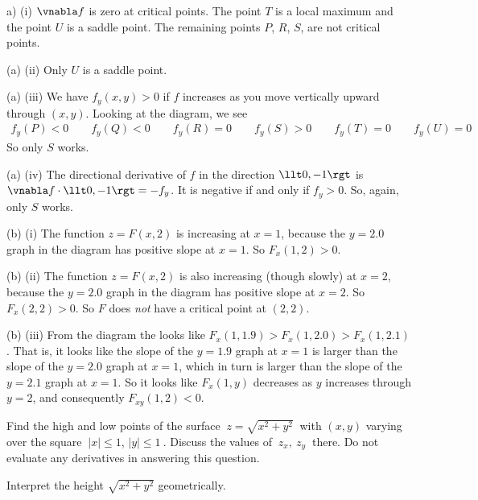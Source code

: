 \begin{solution}
a) (i) $\vnabla f$ is zero at critical points. 
        The point $T$ is a local maximum and the point $U$ is
        a saddle point. The remaining points $P$, $R$, $S$, are not
        critical points.

(a) (ii) Only $U$ is a saddle point. 

(a) (iii) We have $f_y(x,y)>0$ if $f$ increases as you move vertically upward
          through $(x,y)$. Looking at the diagram, we see
\begin{align*}
f_y(P) <0\qquad
f_y(Q) <0\qquad
f_y(R) =0\qquad
f_y(S) >0\qquad
f_y(T) =0\qquad
f_y(U) =0
\end{align*}
So only $S$ works.

(a) (iv) The directional derivative of $f$ in the direction $\llt 0,-1\rgt$
           is $\vnabla f\cdot \llt 0,-1\rgt =-f_y$. It is negative if and
           only if $f_y>0$. So, again, only $S$ works.

(b) (i) The function $z=F(x,2)$ is increasing at $x=1$,
     because the $y=2.0$ graph in the diagram has positive slope at $x=1$.
     So $F_x(1,2)>0$.

(b) (ii) The function $z=F(x,2)$ is also increasing (though slowly) at $x=2$,
     because the $y=2.0$ graph in the diagram has positive slope at $x=2$.
     So $F_x(2,2)>0$. So $F$ does \emph{not} have a critical point
     at $(2,2)$.


(b) (iii) From the diagram the looks like 
                $F_x(1,1.9) > F_x(1,2.0) > F_x(1,2.1)$.
      That is, it looks like the slope of the $y=1.9$ graph at $x=1$
             is larger than the slope of the $y=2.0$ graph at $x=1$,
             which in turn 
             is larger than the slope of the $y=2.1$ graph at $x=1$.
     So it looks like $F_x(1,y)$ decreases as $y$ increases through $y=2$,
     and consequently $F_{xy}(1,2)<0$.
\end{solution}


\begin{question}
Find the high and low points of the surface $\ z=\sqrt{x^2+y^2}\ $ with $(x,y)$ 
varying over the square $\ |x|\le 1$, $|y|\le 1\ $. Discuss the values of 
$\ z_x,\ z_y\ $ there. Do not evaluate any derivatives in answering this 
question.
\end{question}

\begin{hint}
Interpret the height $\sqrt{x^2+y^2}$ geometrically.
\end{hint}

